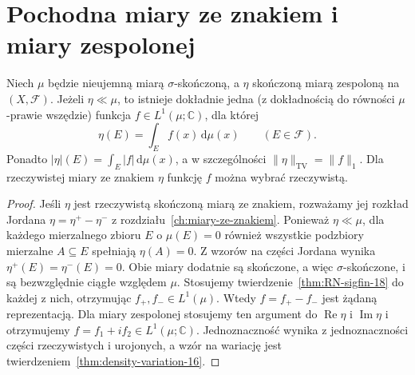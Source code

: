 \section{Pochodna miary ze znakiem i miary zespolonej}
\begin{twierdzenie}
\label{thm:RN-complex-18}
Niech $\mu$ będzie nieujemną miarą $\sigma$-skończoną,
a $\eta$ skończoną miarą zespoloną na $(X,\mathcal F)$.
Jeżeli $\eta\ll\mu$, to istnieje dokładnie jedna
(z dokładnością do równości $\mu$-prawie wszędzie)
funkcja $f\in L^1(\mu;\mathbb C)$, dla której
\begin{equation}\label{eq:RN-complex-18}
\eta(E)=\int_E f(x)\,\mathrm d\mu(x)
\qquad(E\in\mathcal F).
\end{equation}
Ponadto $|\eta|(E)=\int_E|f|\,\mathrm d\mu(x)$,
a w szczególności $\|\eta\|_{\mathrm{TV}}=\|f\|_1$.
Dla rzeczywistej miary ze znakiem $\eta$ funkcję $f$
można wybrać rzeczywistą.
\end{twierdzenie}
\begin{proof}
Jeśli $\eta$ jest rzeczywistą skończoną miarą ze znakiem,
rozważamy jej rozkład Jordana
$\eta=\eta^+-\eta^-$ z rozdziału~\ref{ch:miary-ze-znakiem}.
Ponieważ $\eta\ll\mu$, dla każdego mierzalnego
zbioru $E$ o $\mu(E)=0$ również wszystkie podzbiory
mierzalne $A\subseteq E$ spełniają $\eta(A)=0$.
Z wzorów na części Jordana wynika
$\eta^+(E)=\eta^-(E)=0$. Obie miary dodatnie są
skończone, a więc $\sigma$-skończone, i są
bezwzględnie ciągłe względem $\mu$.
Stosujemy twierdzenie~\ref{thm:RN-sigfin-18} do każdej
z nich, otrzymując $f_+,f_-\in L^1(\mu)$.
Wtedy $f=f_+-f_-$ jest żądaną reprezentacją.
Dla miary zespolonej stosujemy ten argument do
$\operatorname{Re}\eta$ i $\operatorname{Im}\eta$
i otrzymujemy $f=f_1+if_2\in L^1(\mu;\mathbb C)$.
Jednoznaczność wynika z jednoznaczności części
rzeczywistych i urojonych, a wzór na wariację
jest twierdzeniem~\ref{thm:density-variation-16}.
\end{proof}

